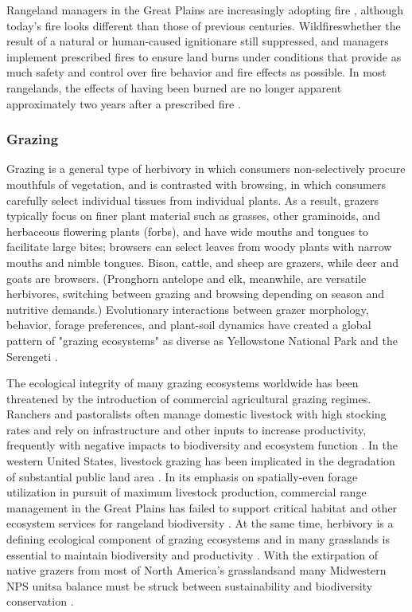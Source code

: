 Rangeland managers in the Great Plains are increasingly adopting fire \citep{twidwell2013}, although today's fire looks different than those of previous centuries. 
Wildfires\textemdash whether the result of a natural or human-caused ignition\textemdash are still suppressed, and managers implement prescribed fires to ensure land burns under conditions that provide as much safety and control over fire behavior and fire effects as possible. 
In most rangelands, the effects of having been burned are no longer apparent approximately two years after a prescribed fire  \citep{limb2016}.  


\subsubsection{Grazing}

Grazing is a general type of herbivory in which consumers non-selectively procure mouthfuls of vegetation, and is contrasted with browsing, in which consumers carefully select individual tissues from individual plants. 
As a result, grazers typically focus on finer plant material such as grasses, other graminoids, and herbaceous flowering plants (forbs), and have wide mouths and tongues to facilitate large bites; browsers can select leaves from woody plants with narrow mouths and nimble tongues. 
Bison, cattle, and sheep are grazers, while deer and goats are browsers. 
(Pronghorn antelope and elk, meanwhile, are versatile herbivores, switching between grazing and browsing depending on season and nutritive demands.)
Evolutionary interactions between grazer morphology, behavior, forage preferences, and plant-soil dynamics have created a global pattern of "grazing ecosystems" as diverse as Yellowstone National Park and the Serengeti \citep{frank1998}. 

The ecological integrity of many grazing ecosystems worldwide has been threatened by the introduction of commercial agricultural grazing regimes. 
Ranchers and pastoralists often manage domestic livestock with high stocking rates and rely on infrastructure and other inputs to increase productivity, frequently with negative impacts to biodiversity and ecosystem function \citep{watkinson2001}. 
In the western United States, livestock grazing has been implicated in the degradation of substantial public land area \citep{fleischner1994}. 
In its emphasis on spatially-even forage utilization in pursuit of maximum livestock production, commercial range management in the Great Plains has failed to support critical habitat and other ecosystem services for rangeland biodiversity \citep{fuhlendorf2001}.
At the same time, herbivory is a defining ecological component of grazing ecosystems and in many grasslands is essential to maintain biodiversity and productivity \citep[e.g.,][]{collins1998, patton2007}. 
With the extirpation of native grazers from most of North America's grasslands\textemdash and many Midwestern NPS units\textemdash a balance must be struck between sustainability and biodiversity conservation \citep{watkinson2001}.

